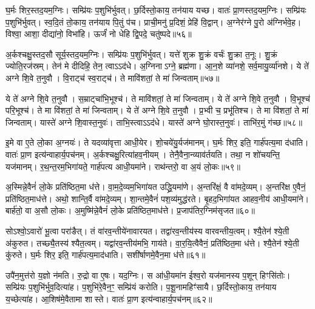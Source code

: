 घ॒र्मः शिर॒स्तद॒यम॒ग्निः।
सम्प्रि॑यः प॒शुभि॑र्भुवत्।
छ॒र्दिस्तो॒काय॒ तन॑याय यच्छ।
वातः॑ प्रा॒णस्तद॒यम॒ग्निः।
सम्प्रि॑यः प॒शुभि॑र्भुवत्।
स्व॒दि॒तं तो॒काय॒ तन॑याय पि॒तुं प॑च।
प्राची॒मनु॑ प्र॒दिशं॒ प्रेहि॑ वि॒द्वान्।
अ॒ग्नेर॑ग्ने पु॒रो अ॑ग्निर्भवे॒ह।
विश्वा॒ आशा॒ दीद्या॑नो॒ विभा॑हि।
ऊर्जं॑ नो धेहि द्वि॒पदे॒ चतु॑ष्पदे॥५६॥

अ॒र्कश्चक्षु॒स्तद॒सौ सूर्य॒स्तद॒यम॒ग्निः।
सम्प्रि॑यः प॒शुभि॑र्भुवत्।
यत्ते॑ शुक्र शु॒क्रं वर्चः॑ शु॒क्रा त॒नूः।
शु॒क्रं ज्योति॒रज॑स्रम्।
तेन॑ मे दीदिहि॒ तेन॒ त्वाऽऽद॑धे।
अ॒ग्निना\-ऽग्ने॒ ब्रह्म॑णा।
आ॒न॒शे व्या॑नशे॒ सर्व॒मायु॒र्व्या॑नशे।
ये ते॑ अग्ने शि॒वे त॒नुवौ।
वि॒राट्च॑ स्व॒राट्च॑।
ते मावि॑शतां॒ ते मा॑ जिन्वताम्॥५७॥

ये ते॑ अग्ने शि॒वे त॒नुवौ।
स॒म्राट्चा॑भि॒भूश्च॑।
ते मावि॑शतां॒ ते मा॑ जिन्वताम्।
ये ते॑ अग्ने शि॒वे त॒नुवौ।
वि॒भूश्च॑ परि॒भूश्च॑।
ते मा वि॑शतां॒ ते मा॑ जिन्वताम्।
ये ते॑ अग्ने शि॒वे त॒नुवौ।
प्र॒भ्वी च॒ प्रभू॑तिश्च।
ते मा वि॑शतां॒ ते मा॑ जिन्वताम्।
यास्ते॑ अग्ने शि॒वास्त॒नुवः॑।
ताभि॒स्त्वाऽऽद॑धे।
यास्ते॑ अग्ने घो॒रास्त॒नुवः॑।
ताभि॑र॒मुं ग॑च्छ॥५८॥\anuvakamend[चतु॑ष्पदे जिन्वतां त॒नुव॒स्त्रीणि॑ च]

इ॒मे वा ए॒ते लो॒का अ॒ग्नयः॑।
ते यदव्या॑वृत्ता आधी॒येर\sn{}।
शो॒चये॑यु॒र्यज॑मानम्।
घ॒र्मः शिर॒ इति॒ गार्\mbox{}ह॑पत्य॒मा द॑धाति।
वातः॑ प्रा॒ण इत्य॑न्वाहार्य॒पच॑नम्।
अ॒र्कश्चक्षु॒रित्या॑हव॒नीयम्।
तेनै॒वैना॒न्व्याव॑र्तयति।
तथा॒ न शो॑चयन्ति॒ यज॑मानम्।
र॒थ॒न्त॒रम॒भिगा॑यते॒ गार्\mbox{}ह॑पत्य आधी॒यमा॑ने।
राथ॑न्तरो॒ वा अ॒यं लो॒कः॥५९॥

अ॒स्मिन्ने॒वैनं॑ लो॒के प्रति॑ष्ठित॒मा ध॑त्ते।
वा॒म॒दे॒व्यम॒भिगा॑यत उद्ध्रि॒यमा॑णे।
अ॒न्तरि॑क्षं॒ वै वा॑मदे॒व्यम्।
अ॒न्तरि॑क्ष ए॒वैनं॒ प्रति॑ष्ठित॒माध॑त्ते।
अथो॒ शान्ति॒र्वै वा॑मदे॒व्यम्।
शा॒न्तमे॒वैनं॑ पश॒व्य॑मुद्ध॑रते।
बृ॒हद॒भिगा॑यत आहव॒नीय॑ आधी॒यमा॑ने।
बार्\mbox{}ह॑तो॒ वा अ॒सौ लो॒कः।
अ॒मुष्मि॑न्ने॒वैनं॑ लो॒के प्रति॑ष्ठित॒माध॑त्ते।
प्र॒जाप॑तिर॒ग्निम॑सृजत॥६०॥

सोऽश्वो॒\-ऽवारो॑ भू॒त्वा परा॑ङैत्।
तं वा॑रव॒न्तीये॑नावारयत।
तद्वा॑रव॒न्तीय॑स्य वारवन्तीय॒त्वम्।
श्यै॒तेन॑ श्ये॒ती अ॑कुरुत।
तच्छ्यै॒तस्य॑ श्यैत॒त्वम्।
यद्वा॑रव॒न्तीय॑मभि॒ गाय॑ते।
वा॒र॒यि॒त्वैवैनं॒ प्रति॑ष्ठित॒मा ध॑त्ते।
श्यै॒तेन॑ श्ये॒ती कु॑रुते।
घ॒र्मः शिर॒ इति॒ गार्\mbox{}ह॑पत्य॒माद॑धाति।
सशी॑र्\mbox{}षाणमे॒वैन॒मा ध॑त्ते॥६१॥

उपै॑न॒मुत्त॑रो य॒ज्ञो न॑मति।
रु॒द्रो वा ए॒षः।
यद॒ग्निः।
स आ॑धी॒यमा॑न ईश्व॒रो यज॑मानस्य प॒शून् हिꣳसि॑तोः।
सम्प्रि॑यः प॒शुभि॑र्भुव॒दित्या॑ह।
प॒शुभि॑रे॒वैन॒ꣳ॒ सम्प्रि॑यं करोति।
प॒शू॒नामहिꣳ॑सायै।
छ॒र्दिस्तो॒काय॒ तन॑याय य॒च्छेत्या॑ह।
आ॒शिष॑मे॒वैतामा शास्ते।
वातः॑ प्रा॒ण इत्य॑न्वाहार्य॒पच॑नम्॥६२॥

